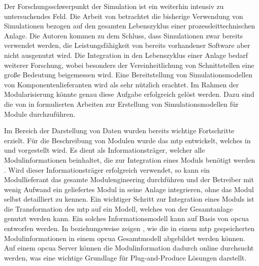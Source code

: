 Der Forschungsschwerpunkt der Simulation ist ein weiterhin intensiv zu untersuchendes Feld. Die Arbeit  von \citeauthor{Oppelt_2015} betrachtet die bisherige Verwendung von Simulationen bezogen auf den gesamten Lebenszyklus einer prozessleittechnischen Anlage. Die Autoren kommen zu dem Schluss, dass Simulationen zwar bereits verwendet werden, die Leistungsf\"ahigkeit von bereits vorhandener Software aber nicht ausgenutzt wird. Die Integration in den Lebenszyklus einer Anlage bedarf weiterer Forschung, wobei besonders der Vereinheitlichung von Schnittstellen eine gro\ss{}e Bedeutung beigemessen wird. Eine Bereitstellung von Simulationsmodellen von Komponentenlieferanten wird als sehr n\"utzlich erachtet. \cite{Oppelt_2015} Im Rahmen der Modularisierung k\"onnte genau diese Aufgabe erfolgreich gel\"ost werden. Dazu sind die von \citeauthor{Bramsiepe_2012} in \cite{Bramsiepe_2012} formulierten Arbeiten zur Erstellung von Simulationsmodellen f\"ur Module durchzuf\"uhren. 

Im Bereich der Darstellung von Daten wurden bereits wichtige Fortschritte erzielt. 
F\"ur die Beschreibung von Modulen wurde das \ac{mtp} entwickelt, welches in \cite{Obst_2015} und \cite{Obst_2015a} vorgestellt wird. Es dient als Informationstr\"ager, welcher alle Modulinformationen beinhaltet, die zur Integration eines Moduls ben\"otigt werden \cite[S. 2]{Obst_2015}. Wird dieser Informationstr\"ager erfolgreich verwendet, so kann ein Modullieferant das gesamte Modulengineering durchf\"uhren und der Betreiber mit wenig Aufwand ein geliefertes Modul in seine Anlage integrieren, ohne das Modul selbst detailliert zu kennen. Ein wichtiger Schritt zur Integration eines Moduls ist die Transformation des \ac{mtp} auf ein Modell, welches von der Gesamtanlage genutzt werden kann. Ein solches Informationsmodell kann auf Basis von \ac{opcua} entworfen werden. In \cite{Wassilew_2016} beziehungsweise \cite{Wassilew_2017} zeigen \citeauthor{Wassilew_2016}, wie die in einem \ac{mtp} gespeicherten Modulinformationen in einem \ac{opcua} Gesamtmodell abgebildet werden k\"onnen. Auf einem \ac{opcua} Server k\"onnen die Modulinformation dadurch online durchsucht werden, was eine wichtige Grundlage f\"ur Plug-and-Produce L\"osungen darstellt. 

